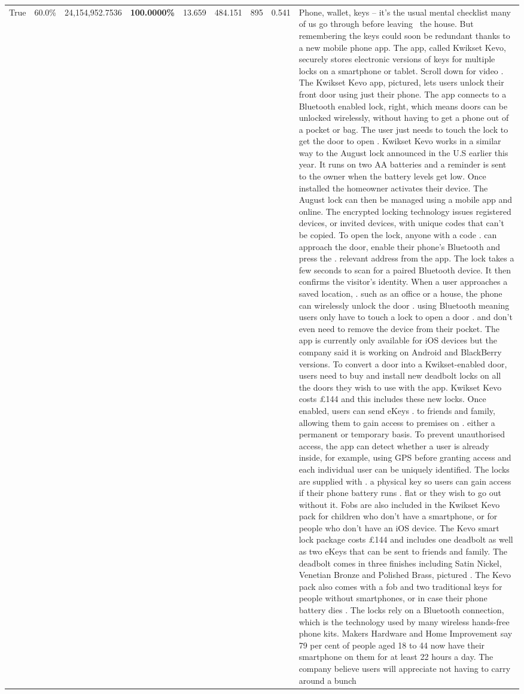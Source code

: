 \begin{table}[H]
\begin{tabular}{lllrlllll}
True & 60.0\% & 24,154,952.7536 & \bfseries \color{red} 100.0000\% & 13.659 & 484.151 & 895 & 0.541 & Phone, wallet, keys – it’s the usual mental checklist many of us go through before leaving  the house. But remembering the keys could soon be redundant thanks to a new mobile phone app. The app, called Kwikset Kevo, securely stores electronic versions of keys for multiple locks on a smartphone or tablet. Scroll down for video . The Kwikset Kevo app, pictured, lets users unlock their front door using just their phone. The app connects to a Bluetooth enabled lock, right, which means doors can be unlocked wirelessly, without having to get a phone out of a pocket or bag. The user just needs to touch the lock to get the door to open . Kwikset Kevo works in a similar way to the August lock announced in the U.S earlier this year. It runs on two AA batteries and a reminder is sent to the owner when the battery levels get low. Once installed the homeowner activates their device. The August lock can then be managed using a mobile app and online. The encrypted locking technology issues registered devices, or invited devices, with unique codes that can't be copied. To open the lock, anyone with a code . can approach the door, enable their phone's Bluetooth and press the . relevant address from the app. The lock takes a few seconds to scan for a paired Bluetooth device. It then confirms the visitor's identity. When a user approaches a saved location, . such as an office or a house, the phone can wirelessly unlock the door . using Bluetooth meaning users only have to touch a lock to open a door . and don't even need to remove the device from their pocket. The app is currently only available for iOS devices but the company said it is working on Android and BlackBerry versions. To convert a door into a Kwikset-enabled door, users need to buy and install new deadbolt locks on all the doors they wish to use with the app. Kwikset Kevo costs £144 and this includes these new locks. Once enabled, users can send eKeys . to friends and family, allowing them to gain access to premises on . either a permanent or temporary basis. To prevent unauthorised access, the app can detect whether a user is already inside, for example, using GPS before granting access and each individual user can be uniquely identified. The locks are supplied with . a physical key so users can gain access if their phone battery runs . flat or they wish to go out without it. Fobs are also included in the Kwikset Kevo pack for children who don't have a smartphone, or for people who don't have an iOS device. The Kevo smart lock package costs £144 and includes one deadbolt as well as two eKeys that can be sent to friends and family. The deadbolt comes in three finishes including Satin Nickel, Venetian Bronze and Polished Brass, pictured . The Kevo pack also comes with a fob and two traditional keys for people without smartphones, or in case their phone battery dies . The locks rely on a Bluetooth connection, which is the technology used by many wireless hands-free phone kits. Makers Hardware and Home Improvement say 79 per cent of people aged 18 to 44 now have their smartphone on them for at least 22 hours a day. The company believe users will appreciate not having to carry around a bunch 
\end{tabular}
\end{table}
